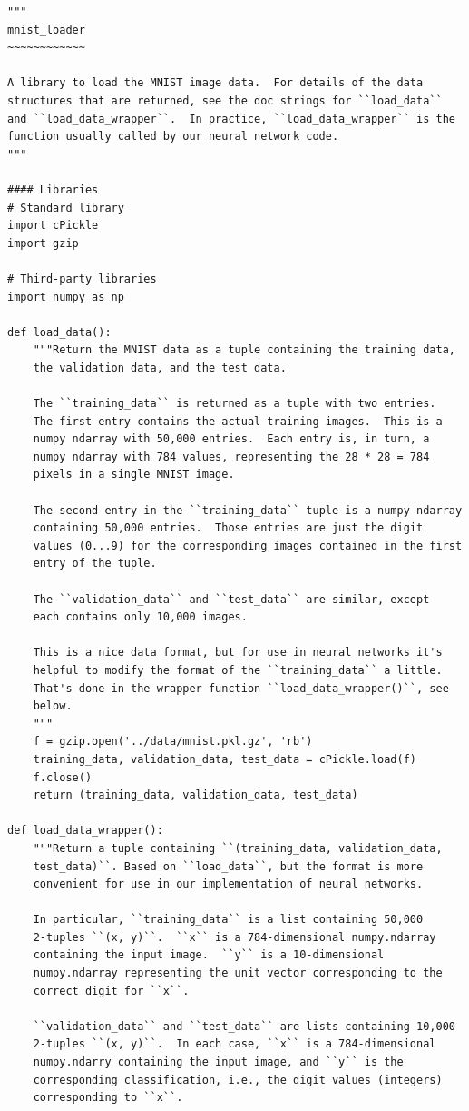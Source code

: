 \begin{lstlisting}
"""
mnist_loader
~~~~~~~~~~~~

A library to load the MNIST image data.  For details of the data
structures that are returned, see the doc strings for ``load_data``
and ``load_data_wrapper``.  In practice, ``load_data_wrapper`` is the
function usually called by our neural network code.
"""

#### Libraries
# Standard library
import cPickle
import gzip

# Third-party libraries
import numpy as np

def load_data():
    """Return the MNIST data as a tuple containing the training data,
    the validation data, and the test data.

    The ``training_data`` is returned as a tuple with two entries.
    The first entry contains the actual training images.  This is a
    numpy ndarray with 50,000 entries.  Each entry is, in turn, a
    numpy ndarray with 784 values, representing the 28 * 28 = 784
    pixels in a single MNIST image.

    The second entry in the ``training_data`` tuple is a numpy ndarray
    containing 50,000 entries.  Those entries are just the digit
    values (0...9) for the corresponding images contained in the first
    entry of the tuple.

    The ``validation_data`` and ``test_data`` are similar, except
    each contains only 10,000 images.

    This is a nice data format, but for use in neural networks it's
    helpful to modify the format of the ``training_data`` a little.
    That's done in the wrapper function ``load_data_wrapper()``, see
    below.
    """
    f = gzip.open('../data/mnist.pkl.gz', 'rb')
    training_data, validation_data, test_data = cPickle.load(f)
    f.close()
    return (training_data, validation_data, test_data)

def load_data_wrapper():
    """Return a tuple containing ``(training_data, validation_data,
    test_data)``. Based on ``load_data``, but the format is more
    convenient for use in our implementation of neural networks.

    In particular, ``training_data`` is a list containing 50,000
    2-tuples ``(x, y)``.  ``x`` is a 784-dimensional numpy.ndarray
    containing the input image.  ``y`` is a 10-dimensional
    numpy.ndarray representing the unit vector corresponding to the
    correct digit for ``x``.

    ``validation_data`` and ``test_data`` are lists containing 10,000
    2-tuples ``(x, y)``.  In each case, ``x`` is a 784-dimensional
    numpy.ndarry containing the input image, and ``y`` is the
    corresponding classification, i.e., the digit values (integers)
    corresponding to ``x``.


\end{lstlisting}
